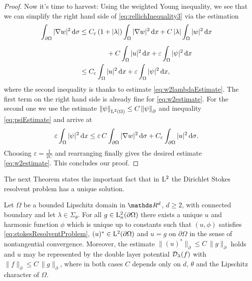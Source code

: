 \begin{proof}
  Now it's time to harvest: 
  Using the weighted Young inequality, we see that we can simplify the right hand side of \eqref{eq:rellichInequality3} via the estimation
  \begin{align*}
    \int_{\partial\Omega} |\nabla w|^2 \, {\operatorname{d}\!{\sigma}} 
    &\leq C_\varepsilon\,  (1 + |\lambda|) \int_{\Omega} |\nabla w|^2 \, {\operatorname{d}\!{x}} + C\,  |\lambda| \int_\Omega |w|^2 \, {\operatorname{d}\!{x}} \\[0.5em]
    &\qquad\qquad+ C \int_\Omega |u|^2 \, {\operatorname{d}\!{x}} + \varepsilon \int_\Omega |\psi|^2 \, {\operatorname{d}\!{x}}  \\
    &\leq C_\varepsilon \int_\Omega |u|^2 \, {\operatorname{d}\!{x}} + \varepsilon \int_\Omega |\psi|^2 \, {\operatorname{d}\!{x}},
  \end{align*}
  where the second inequality is thanks to estimate \eqref{eq:w2lambdaEstimate}.
  The first term on the right hand side is already fine for \eqref{eq:w2estimate}.
  For the second one we use the estimate $\|\psi\|^{}_{\mathrm{L}^2(\Omega)} \leq C\, \|\psi\|^{}_\partial$ and inequality \eqref{eq:psiEstimate} and arrive at
  \begin{align*}
    \varepsilon \int_\Omega |\psi|^2 \, {\operatorname{d}\!{x}} \leq \varepsilon \, C \int_{\partial\Omega} |\nabla w|^2 \, {\operatorname{d}\!{\sigma}} + C_\varepsilon \int_{\partial\Omega} |u|^2 \, {\operatorname{d}\!{\sigma}}.
  \end{align*}
  Choosing $\varepsilon = \frac{1}{2 C}$ and rearranging finally gives the desired estimate \eqref{eq:w2estimate}.
  This concludes our proof.
\end{proof}

The next Theorem states the important fact that in $\mathrm{L}^2$ the Dirichlet Stokes resolvent problem has a unique solution.

\begin{thm}
  \label{thm:exAndUniqueSolution}
  Let $\Omega$ be a bounded Lipschitz domain in $\R^d$, $d \geq 2$, with connected boundary and let $\lambda \in \Sigma_\theta$.
  For all $g \in \mathrm{L}^2_n(\partial\Omega)$ there exists a unique $u$ and harmonic function $\phi$ which is unique up to constants such that $(u,\phi)$ satisfies \eqref{eq:stokesResolventProblem}, $(u)^* \in \mathrm{L}^2(\partial\Omega)$ and $u = g$ on $\partial\Omega$ in the sense of nontangential convergence.
  Moreover, the estimate $ \| (u)^* \|^{}_\partial \leq C \, \| g\|^{}_\partial$ holds and $u$ may be represented by the double layer potential $\mathcal{D}_\lambda(f)$ with $\|f\|^{}_\partial \leq C \, \|g\|^{}_\partial$, where in both cases $C$ depends only on $d$, $\theta$ and the Lipschitz character of $\Omega$.
\end{thm}

